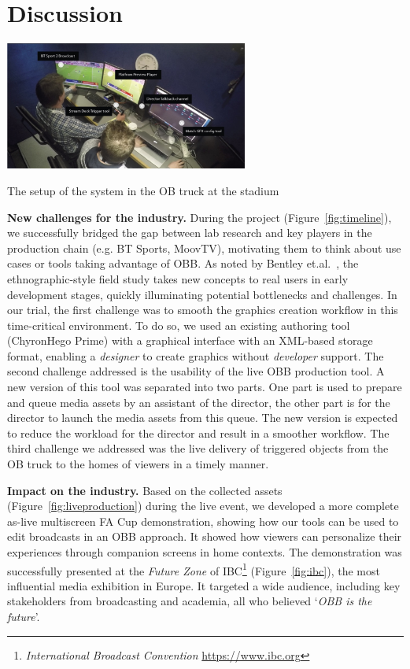 \documentclass[sigchi-a]{acmart}
\begin{document}
\section{Discussion}

\begin{marginfigure}
    \vspace{-8pc}
    \hspace*{-1cm}
    \includegraphics[width=8cm]{Figures/liveproduction.jpg}
    \caption{The setup of the system in the OB truck at the stadium}
    \label{fig:liveproduction}
\end{marginfigure}

\textbf{New challenges for the industry.} During the project
(Figure~\ref{fig:timeline}), we successfully bridged the gap between lab
research and key players in the production chain (e.g. BT Sports, MoovTV),
motivating them to think about use cases or tools taking advantage of
OBB\@. As noted by Bentley et.al.~\cite{bentley2009}, the ethnographic-style
field study takes new concepts to real users in early development stages,
quickly illuminating potential bottlenecks and challenges. In our trial, the
first challenge was to smooth the graphics creation workflow in this
time-critical environment. To do so, we used an existing authoring tool
(ChyronHego Prime) with a graphical interface with an XML-based storage format,
enabling a \textit{designer} to create graphics without \textit{developer} support.
The second challenge addressed is the usability of the live OBB production
tool. A new version of this tool was separated into two parts. One part is
used to prepare and queue media assets by an assistant of the director, the
other part is for the director to launch the media assets from this queue. The new
version is expected to reduce the workload for the director and result in a
smoother workflow. The third challenge we addressed was the live delivery of
triggered objects from the OB truck to the homes of viewers in a timely
manner.

\vspace{5pt}\noindent\textbf{Impact on the industry.} Based on the collected assets
(Figure~\ref{fig:liveproduction}) during the live event, we developed a more complete as-live multiscreen
FA Cup demonstration, showing how our tools can be used to edit broadcasts
in an OBB approach. It showed how viewers can personalize their experiences
through companion screens in home contexts. The demonstration was successfully
presented at the \emph{Future Zone} of IBC\footnote{\emph{International Broadcast Convention} \url{https://www.ibc.org}} (Figure~\ref{fig:ibc}), the most
influential media exhibition in Europe. It targeted a wide audience, including
key stakeholders from broadcasting and academia, all who believed `\emph{OBB is the future}'.
\end{document}

